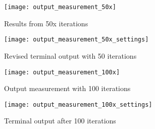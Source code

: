 \begin{figure}[!htb]
	\centering
	\texttt{[image: output\_measurement\_50x]}
	\caption{Results from 50x iterations}
\end{figure}

\begin{figure}[!htb]
	\centering
	\texttt{[image: output\_measurement\_50x\_settings]}
	\caption{Revised terminal output with 50 iterations}
\end{figure}

\begin{figure}[!htb]
	\centering
	\texttt{[image: output\_measurement\_100x]}
	\caption{Output measurement with 100 iterations}
\end{figure}

\begin{figure}[!htb]
	\centering
	\texttt{[image: output\_measurement\_100x\_settings]}
	\caption{Terminal output after 100 iterations}
\end{figure}